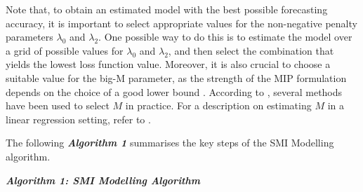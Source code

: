 \documentclass[
  11pt,
  a4paper,
]{article}
\begin{document}
Note that, to obtain an estimated model with the best possible
forecasting accuracy, it is important to select appropriate values for
the non-negative penalty parameters \(\lambda_{0}\) and \(\lambda_{2}\).
One possible way to do this is to estimate the model over a grid of
possible values for \(\lambda_{0}\) and \(\lambda_{2}\), and then select
the combination that yields the lowest loss function value. Moreover, it
is also crucial to choose a suitable value for the big-M parameter, as
the strength of the MIP formulation depends on the choice of a good
lower bound \autocite{Bertsimas2016}. According to
\textcite{Hazimeh2023}, several methods have been used to select \(M\)
in practice. For a description on estimating \(M\) in a linear
regression setting, refer to \textcite{Bertsimas2016}.

The following \textbf{\emph{Algorithm 1}} summarises the key steps of
the SMI Modelling algorithm. \newline

\textbf{\emph{Algorithm 1: SMI Modelling Algorithm}}
\end{document}
